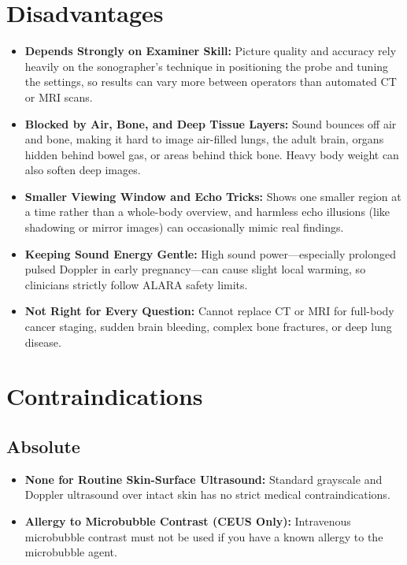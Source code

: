 \section{Disadvantages}

\begin{itemize}
    \item \textbf{Depends Strongly on Examiner Skill:} Picture quality and accuracy rely heavily on the sonographer's technique in positioning the probe and tuning the settings, so results can vary more between operators than automated CT or MRI scans.
    \item \textbf{Blocked by Air, Bone, and Deep Tissue Layers:} Sound bounces off air and bone, making it hard to image air-filled lungs, the adult brain, organs hidden behind bowel gas, or areas behind thick bone. Heavy body weight can also soften deep images.
    \item \textbf{Smaller Viewing Window and Echo Tricks:} Shows one smaller region at a time rather than a whole-body overview, and harmless echo illusions (like shadowing or mirror images) can occasionally mimic real findings.
    \item \textbf{Keeping Sound Energy Gentle:} High sound power---especially prolonged pulsed Doppler in early pregnancy---can cause slight local warming, so clinicians strictly follow ALARA safety limits.
    \item \textbf{Not Right for Every Question:} Cannot replace CT or MRI for full-body cancer staging, sudden brain bleeding, complex bone fractures, or deep lung disease.
\end{itemize}

\section{Contraindications}

\subsection{Absolute}

\begin{itemize}
    \item \textbf{None for Routine Skin-Surface Ultrasound:} Standard grayscale and Doppler ultrasound over intact skin has no strict medical contraindications.
    \item \textbf{Allergy to Microbubble Contrast (CEUS Only):} Intravenous microbubble contrast must not be used if you have a known allergy to the microbubble agent.
\end{itemize}

